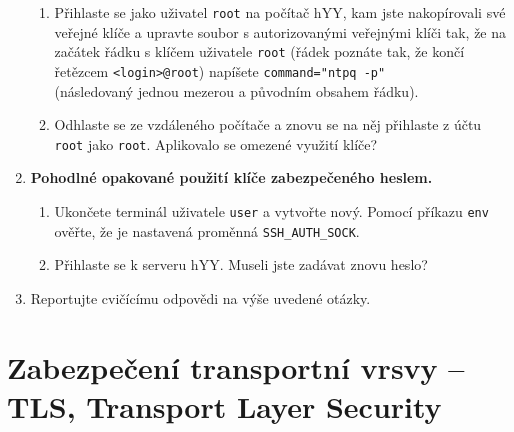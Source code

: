 \documentclass[a4paper,11pt]{article}
\begin{document}
\begin{enumerate}
\begin{enumerate}
      \item Přihlaste se jako uživatel {\tt root} na počítač hYY, kam jste nakopírovali své veřejné klíče a
        upravte soubor s autorizovanými veřejnými klíči tak, že na začátek
        řádku s klíčem uživatele {\tt root} (řádek poznáte tak, že končí řetězcem
        {\tt <login>@root}) napíšete
        \verb|command="ntpq -p" | \\ (následovaný jednou mezerou a původním
        obsahem řádku).

      \item Odhlaste se ze vzdáleného počítače a znovu se na něj přihlaste z
        účtu {\tt root} jako {\tt root}. Aplikovalo se
        omezené využití klíče?

    \end{enumerate}


  \item {\bf Pohodlné opakované použití klíče zabezpečeného heslem.}

    \begin{enumerate}

      \item Ukončete terminál uživatele {\tt user} a vytvořte nový. Pomocí
        příkazu \verb|env| ověřte, že je nastavená proměnná
        \verb|SSH_AUTH_SOCK|.

      \item Přihlaste se k serveru hYY. Museli jste zadávat znovu heslo?

    \end{enumerate}
  \item Reportujte cvičícímu odpovědi na výše uvedené otázky.

\end{enumerate}

\section{Zabezpečení transportní vrsvy -- TLS, Transport Layer Security}
\end{document}
